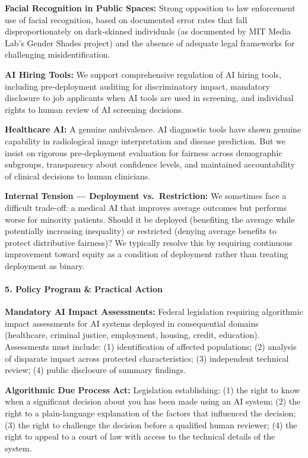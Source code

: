 \textbf{Facial Recognition in Public Spaces:} Strong opposition to law
enforcement use of facial recognition, based on documented error rates
that fall disproportionately on dark-skinned individuals (as documented
by MIT Media Lab's Gender Shades project) and the absence of adequate
legal frameworks for challenging misidentification.

\textbf{AI Hiring Tools:} We support comprehensive regulation of AI
hiring tools, including pre-deployment auditing for discriminatory
impact, mandatory disclosure to job applicants when AI tools are used in
screening, and individual rights to human review of AI screening
decisions.

\textbf{Healthcare AI:} A genuine ambivalence. AI diagnostic tools have
shown genuine capability in radiological image interpretation and
disease prediction. But we insist on rigorous pre-deployment evaluation
for fairness across demographic subgroups, transparency about confidence
levels, and maintained accountability of clinical decisions to human
clinicians.

\textbf{Internal Tension --- Deployment vs.~Restriction:} We sometimes
face a difficult trade-off: a medical AI that improves average outcomes
but performs worse for minority patients. Should it be deployed
(benefiting the average while potentially increasing inequality) or
restricted (denying average benefits to protect distributive fairness)?
We typically resolve this by requiring continuous improvement toward
equity as a condition of deployment rather than treating deployment as
binary.

\paragraph{5. Policy Program \& Practical
Action}\label{policy-program-practical-action-5}

\textbf{Mandatory AI Impact Assessments:} Federal legislation requiring
algorithmic impact assessments for AI systems deployed in consequential
domains (healthcare, criminal justice, employment, housing, credit,
education). Assessments must include: (1) identification of affected
populations; (2) analysis of disparate impact across protected
characteristics; (3) independent technical review; (4) public disclosure
of summary findings.

\textbf{Algorithmic Due Process Act:} Legislation establishing: (1) the
right to know when a significant decision about you has been made using
an AI system; (2) the right to a plain-language explanation of the
factors that influenced the decision; (3) the right to challenge the
decision before a qualified human reviewer; (4) the right to appeal to a
court of law with access to the technical details of the system.

